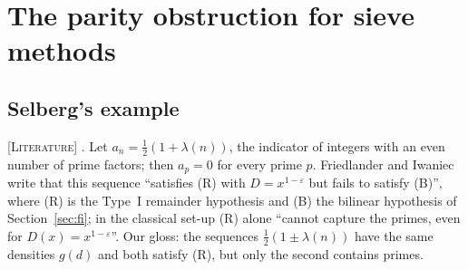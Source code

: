 \documentclass[11pt]{amsart}
\theoremstyle{definition}
\theoremstyle{remark}
\newcommand{\lbl}[1]{\textup{\textsc{[#1]}}}
\begin{document}
\section{The parity obstruction for sieve methods}\label{sec:parity}

\subsection{Selberg's example}
\lbl{Literature} \cite[pp.~1044--1045]{FI98}. Let $a_n=\tfrac12(1+\lambda(n))$,
the indicator of integers with an even number of prime factors; then
$a_p=0$ for every prime $p$. Friedlander and Iwaniec write that this sequence
``satisfies (R) with $D=x^{1-\varepsilon}$ but fails to satisfy (B)'', where
(R) is the Type~I remainder hypothesis and (B) the bilinear hypothesis of
Section~\ref{sec:fi}; in the classical set-up (R) alone ``cannot capture the
primes, even for $D(x)=x^{1-\varepsilon}$''. Our gloss: the sequences
$\tfrac12(1\pm\lambda(n))$ have the same densities $g(d)$ and both satisfy
(R), but only the second contains primes.
\end{document}
